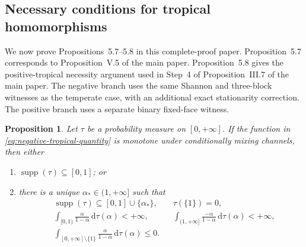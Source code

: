 \documentclass[aps,pra,11pt,onecolumn,nofootinbib,tightenlines]{revtex4-2}
\newtheorem{proposition}[theorem]{Proposition}
\theoremstyle{definition}
\begin{document}
\subsection{Necessary conditions for tropical homomorphisms}
\label{sec:tropical-necessity}

We now prove Propositions~5.7--5.8 in this complete-proof paper. Proposition~5.7
corresponds to Proposition~V.5 of the main paper. Proposition~5.8 gives the
positive-tropical necessity argument used in Step~4 of Proposition~III.7 of the
main paper.
The negative branch uses the same Shannon and three-block witnesses as the
temperate case, with an additional exact stationarity correction.  The
positive branch uses a separate binary fixed-face witness.

\begin{proposition}
\label{prop:negative-tropical-necessary}
Let $\tau$ be a probability measure on $[0,+\infty]$.  If the function in
\eqref{eq:negative-tropical-quantity} is monotone under conditionally mixing
channels, then either
\begin{enumerate}
 \item $\operatorname{supp}(\tau)\subseteq[0,1]$; or
 \item there is a unique $\alpha_*\in(1,+\infty]$ such that
 \begin{equation}
  \begin{aligned}
  &\operatorname{supp}(\tau)\subseteq[0,1]\cup\{\alpha_*\},
  &&\tau(\{1\})=0,\\
  &\int_{[0,1)}\frac{\alpha}{1-\alpha}\,\mathrm d\tau(\alpha)<+\infty,
  &&\int_{(1,+\infty]}\frac{-\alpha}{1-\alpha}\,\mathrm d\tau(\alpha)<+\infty,\\
  &\int_{[0,+\infty]\setminus\{1\}}
  \frac{\alpha}{1-\alpha}\,\mathrm d\tau(\alpha)\leq0.
  \end{aligned}
  \label{eq:negative-tropical-necessary-condition}
 \end{equation}
\end{enumerate}
\end{proposition}
\end{document}
